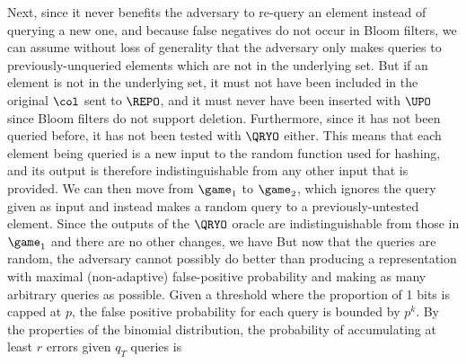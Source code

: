 {Next, since it never benefits the
adversary to re-query an element instead of querying a new one, and because
false negatives do not occur in Bloom filters, we can assume without loss of
generality that the adversary only makes queries to previously-unqueried
elements which are not in the underlying set. But if an element is not in the
underlying set, it must not have been included in the original $\col$ sent to
$\REPO$, and it must never have been inserted with $\UPO$ since Bloom filters do
not support deletion. Furthermore, since it has not been queried before, it has
not been tested with $\QRYO$ either. This means that each element being queried
is a new input to the random function used for hashing, and its output is
therefore indistinguishable from any other input that is provided. We can then
move from $\game_1$ to $\game_2$, which ignores the query given as input and
instead makes a random query to a previously-untested element. Since the outputs
of the $\QRYO$ oracle are indistinguishable from those in $\game_1$ and there
are no other changes, we have
%
%
But now
that the queries are random, the adversary cannot possibly do better than
producing a representation with maximal (non-adaptive) false-positive
probability and making as many arbitrary queries as possible. Given a threshold
where the proportion of 1 bits is capped at $p$,  the false positive probability for each query is bounded by $p^k$.
%
%
By the properties of the binomial distribution, the probability of accumulating
at
least $r$ errors given $q_T$ queries is
}